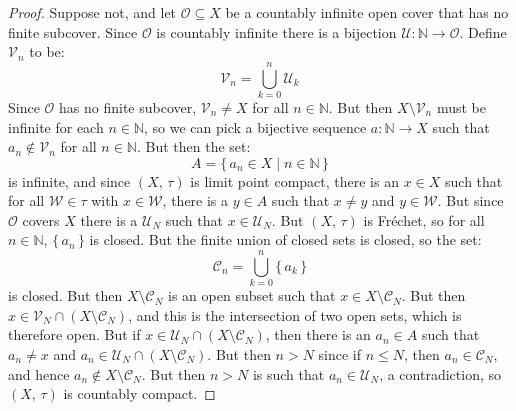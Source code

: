 \documentclass{article}
\theoremstyle{plain}
\theoremstyle{normal}
\begin{document}
        \begin{proof}
            Suppose not, and let $\mathcal{O}\subseteq{X}$ be a countably
            infinite open cover that has no finite subcover. Since
            $\mathcal{O}$ is countably infinite there is a bijection
            $\mathcal{U}:\mathbb{N}\rightarrow\mathcal{O}$. Define
            $\mathcal{V}_{n}$ to be:
            \begin{equation}
                \mathcal{V}_{n}=\bigcup_{k=0}^{n}\mathcal{U}_{k}
            \end{equation}
            Since $\mathcal{O}$ has no finite subcover, $\mathcal{V}_{n}\ne{X}$
            for all $n\in\mathbb{N}$. But then $X\setminus\mathcal{V}_{n}$ must
            be infinite for each $n\in\mathbb{N}$, so we can pick a bijective
            sequence $a:\mathbb{N}\rightarrow{X}$ such that
            $a_{n}\notin\mathcal{V}_{n}$ for all $n\in\mathbb{N}$. But then
            the set:
            \begin{equation}
                A=\{\,a_{n}\in{X}\;|\;n\in\mathbb{N}\,\}
            \end{equation}
            is infinite, and since $(X,\,\tau)$ is limit point compact, there
            is an $x\in{X}$ such that for all $\mathcal{W}\in\tau$ with
            $x\in\mathcal{W}$, there is a $y\in{A}$ such that $x\ne{y}$ and
            $y\in\mathcal{W}$. But since $\mathcal{O}$ covers $X$ there is a
            $\mathcal{U}_{N}$ such that $x\in\mathcal{U}_{N}$. But $(X,\,\tau)$
            is Fr\'{e}chet, so for all $n\in\mathbb{N}$, $\{\,a_{n}\,\}$ is
            closed. But the finite union of closed sets is closed, so the set:
            \begin{equation}
                \mathcal{C}_{n}=\bigcup_{k=0}^{n}\{\,a_{k}\,\}
            \end{equation}
            is closed. But then $X\setminus\mathcal{C}_{N}$ is an open
            subset such that $x\in{X}\setminus\mathcal{C}_{N}$. But then
            $x\in\mathcal{V}_{N}\cap(X\setminus\mathcal{C}_{N})$, and this
            is the intersection of two open sets, which is therefore open. But
            if $x\in\mathcal{U}_{N}\cap(X\setminus\mathcal{C}_{N})$, then
            there is an $a_{n}\in{A}$ such that $a_{n}\ne{x}$ and
            $a_{n}\in\mathcal{U}_{N}\cap(X\setminus\mathcal{C}_{N})$. But
            then $n>N$ since if $n\leq{N}$, then $a_{n}\in\mathcal{C}_{N}$, and
            hence $a_{n}\notin{X}\setminus\mathcal{C}_{N}$. But then
            $n>N$ is such that $a_{n}\in\mathcal{U}_{N}$, a contradiction,
            so $(X,\,\tau)$ is countably compact.
        \end{proof}
\end{document}
